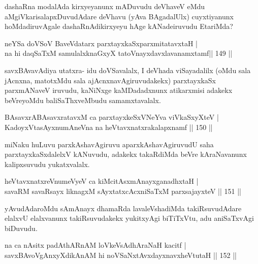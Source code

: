 \begin{artha}
dashaRna modalAda kirxyeyanunx mADuvudu deVhaveV eMdu aMgiVkarisalapxDuvudAdare deVhavu (yAva BAgadalUlx) cuyxtiyanunx hoMdadiruvAgale dashaRnAdikirxyeyu hAge kANadeiruvudu EtariMda?
\end{artha}


\begin{shl}
neYSa doVSoV BaveVdatarx parxtayxkaSxparxmitatavxtaH | \\
na hi daqSaTxM samulalxknaGxyX tatoV\s nayxdavxlavanamxtamf\hfill||  149 ||  
\end{shl}

\begin{artha}
savxBAvavAdiya utatxra- idu doVSavalalx, I deVhada viSayadalilx (oMdu sala jAcnxna, matotxMdu sala ajAcnxnavAgiruvudakekx) parxtayxkaSx parxmANaveV iruvudu, kaNiNxge kaMDadadxnunx atikarxmisi adakekx beVreyoMdu baliSaThxveMbudu samamxtavalalx.
\end{artha}

\begin{shl}
BAsavxrABAsavxratavxM ca parxtayxkeSxVNeYva viVkaSxyXteV |  \\
KadoyxVtasAyxnumAneVna na heVtavxnatxrakalapxnamf \hfill||  150 ||  
\end{shl}

\begin{artha}
miNaku huLuvu parxkAshavAgiruvu aparxkAshavAgiruvudU saha parxtayxkaSxdalelxV kANuvudu, adakekx takaRdiMda beVre kAraNavanunx kalipxsuvudu yukatxvalalx.
\end{artha}

\begin{shl}
heVtavxnatxreV\s numeVyeV ca kiMcitAsxmAnayxganadhxtaH | \\
savaRM savaRsayx liknagxM sAyxtatxcAcxniSaTxM parxsajayxteV \hfill||  151 ||  
\end{shl}

\begin{artha}
yAvudAdaroMdu sAmAnayx dhamaRda lavaleVshadiMda takiRsuvudAdare elalxvU elalxvanunx takiRsuvudakekx yukitxyAgi biTiTxVtu, adu aniSaTxvAgi biDuvudu.
\end{artha}

\begin{shl}
na ca nAsitx padAthARnAM loVkeV\s sAdhAraNaH kacitf | \\
savxBAvoV\s gAnxyXdikAnAM hi noVSaNxtAvxdayxnavxheVtutaH \hfill||  152 ||  
\end{shl}

